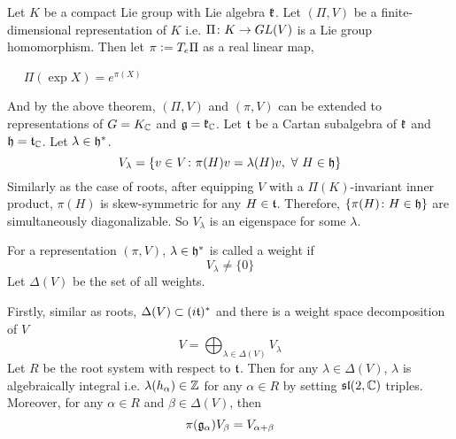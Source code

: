 \documentclass[a4paper,12pt]{article}
\begin{document}
	Let $K$ be a compact Lie group with Lie algebra $\mathfrak{k}$. Let $(\Pi,V)$ be a finite-dimensional representation of $K$ i.e. $\Pi \colon K \rightarrow GL(V)$ is a Lie group homomorphism. Then let $\pi \vcentcolon= T_e\Pi$ as a real linear map, 
	\begin{center}
		~~ $\Pi(\exp X) = e^{\pi(X)}$
	\end{center}
	And by the above theorem, $(\Pi,V)$ and $(\pi,V)$ can be extended to representations of $G = K_{\mathbb{C}}$ and $\mathfrak{g} = \mathfrak{k}_{\mathbb{C}}$. Let $\mathfrak{t}$ be a Cartan subalgebra of $\mathfrak{k}$ and $\mathfrak{h} = \mathfrak{t}_{\mathbb{C}}$. Let $\lambda \in \mathfrak{h}^*$.
	\begin{equation*}
		V_{\lambda} = \left\{v \in V \colon \pi(H)v = \lambda(H)v,~\forall~H\in \mathfrak{h}\right\}
	\end{equation*}
	Similarly as the case of roots, after equipping $V$ with a $\Pi(K)$-invariant inner product, $\pi(H)$ is skew-symmetric for any $H \in \mathfrak{t}$. Therefore, $\left\{\pi(H) \colon H \in \mathfrak{h}\right\}$ are simultaneously diagonalizable. So $V_{\lambda}$ is an eigenspace for some $\lambda$. 
	\begin{defn}
		For a representation $(\pi,V)$, $\lambda \in \mathfrak{h}^*$ is called a weight if
		\begin{equation*}
			V_{\lambda} \neq \{0\}
		\end{equation*}
		Let $\Delta(V)$ be the set of all weights.
	\end{defn}
	\begin{rem}
		Firstly, similar as roots, $\Delta(V) \subset (i\mathfrak{t})^*$ and there is a weight space decomposition of $V$
		\begin{equation*}
			V = \bigoplus_{\lambda \in \Delta(V)}V_{\lambda}
		\end{equation*}
		Let $R$ be the root system with respect to $\mathfrak{t}$. Then for any $\lambda  \in \Delta(V)$, $\lambda$ is algebraically integral i.e. $\lambda(h_{\alpha}) \in \mathbb{Z}$ for any $\alpha \in R$ by setting $\mathfrak{sl}(2,\mathbb{C})$ triples. Moreover, for any $\alpha \in R$ and $\beta \in \Delta(V)$, then
		\begin{equation*}
			\pi(\mathfrak{g}_{\alpha})V_{\beta} = V_{\alpha + \beta}
		\end{equation*}
	\end{rem}
\end{document}
